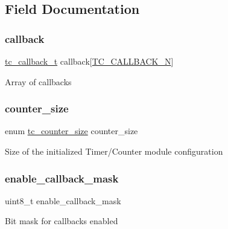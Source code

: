 \subsection{Field Documentation}
\mbox{\label{structtc__module_ad76de8a864ec5d6ba1eb04dd8b758adf}} 
\subsubsection{\texorpdfstring{callback}{callback}}
{\footnotesize\ttfamily \mbox{\hyperlink{group__asfdoc__sam0__tc__group_ga2a1d57f42085001f29a6584ae8ab1bb4}{tc\+\_\+callback\+\_\+t}} callback\mbox{[}\mbox{\hyperlink{group__asfdoc__sam0__tc__group_gga7d3fb5365e46bd4efae2885bd508067faf76c479c366d3c15450245bb4ee9a856}{T\+C\+\_\+\+C\+A\+L\+L\+B\+A\+C\+K\+\_\+N}}\mbox{]}}

Array of callbacks \mbox{\label{structtc__module_aab0e5adb1f12875949e072f548ce2895}} 
\subsubsection{\texorpdfstring{counter\_size}{counter\_size}}
{\footnotesize\ttfamily enum \mbox{\hyperlink{group__asfdoc__sam0__tc__group_ga1b112627b81227c49c16b1a93e3321a0}{tc\+\_\+counter\+\_\+size}} counter\+\_\+size}

Size of the initialized Timer/\+Counter module configuration \mbox{\label{structtc__module_a79ea1f5a1699e0e2c93bd3d993257e45}} 
\subsubsection{\texorpdfstring{enable\_callback\_mask}{enable\_callback\_mask}}
{\footnotesize\ttfamily uint8\+\_\+t enable\+\_\+callback\+\_\+mask}

Bit mask for callbacks enabled \mbox{\label{structtc__module_a4e05e4e73ff3a72e16b23bb2e44af519}} 
